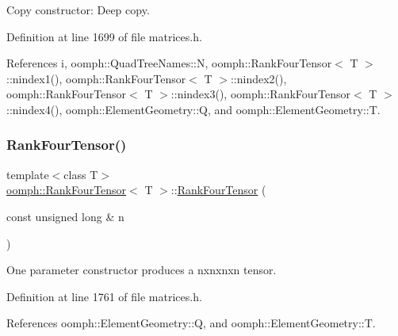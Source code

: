 Copy constructor\+: Deep copy. 



Definition at line 1699 of file matrices.\+h.



References i, oomph\+::\+Quad\+Tree\+Names\+::N, oomph\+::\+Rank\+Four\+Tensor$<$ T $>$\+::nindex1(), oomph\+::\+Rank\+Four\+Tensor$<$ T $>$\+::nindex2(), oomph\+::\+Rank\+Four\+Tensor$<$ T $>$\+::nindex3(), oomph\+::\+Rank\+Four\+Tensor$<$ T $>$\+::nindex4(), oomph\+::\+Element\+Geometry\+::Q, and oomph\+::\+Element\+Geometry\+::T.

\mbox{\label{classoomph_1_1RankFourTensor_abc9c7f196e6a8521ee01a8a656700cc4}} 
\subsubsection{\texorpdfstring{Rank\+Four\+Tensor()}{RankFourTensor()}\hspace{0.1cm}{\footnotesize\ttfamily [3/5]}}
{\footnotesize\ttfamily template$<$class T$>$ \\
\hyperlink{classoomph_1_1RankFourTensor}{oomph\+::\+Rank\+Four\+Tensor}$<$ T $>$\+::\hyperlink{classoomph_1_1RankFourTensor}{Rank\+Four\+Tensor} (\begin{DoxyParamCaption}\item[{const unsigned long \&}]{n }\end{DoxyParamCaption})\hspace{0.3cm}{\ttfamily [inline]}}



One parameter constructor produces a nxnxnxn tensor. 



Definition at line 1761 of file matrices.\+h.



References oomph\+::\+Element\+Geometry\+::Q, and oomph\+::\+Element\+Geometry\+::T.

\mbox{\label{classoomph_1_1RankFourTensor_a24e7326e6ca5143f47d221ad7f45e7a6}} 
